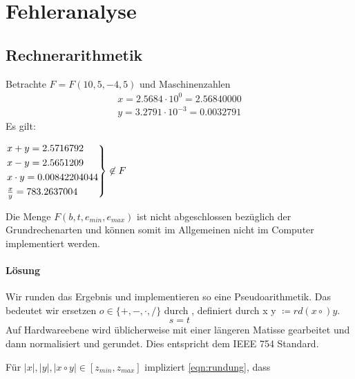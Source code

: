 \section{Fehleranalyse}
\subsection{Rechnerarithmetik}
\begin{example}
Betrachte $F=F(10,5,-4,5)$ und Maschinenzahlen
\begin{align*}
x=2.5684 \cdot 10^{0}= 2.56840000 \\
y=3.2791 \cdot 10^{-3} = 0.0032791
\end{align*}
Es gilt:\\
\begin{center}
$\begin{rcases}
	x+y= 2.5716792 \\
	x-y= 2.5651209 \\
	x \cdot y= 0.00842204044 \\
	\frac{x}{y}= 783.2637004
\end{rcases} \not\in F$
\end{center}
\end{example}
\begin{remark}
Die Menge $F(b,t,e_{min},e_{max})$ ist nicht abgeschlossen bezüglich der Grundrechenarten und können somit im Allgemeinen nicht im Computer implementiert werden.
\end{remark}
\paragraph{Lösung}
Wir runden das Ergebnis und implementieren so eine Pseudoarithmetik.
Das bedeutet wir ersetzen $o \in \{+,-,\cdot,/\} $ durch , definiert durch x  y $\coloneqq rd(x \circ )y$. 
\begin{equation}\label{eqn:rundung}
s=t
\end{equation}
Auf Hardwareebene wird üblicherweise mit einer längeren Matisse gearbeitet und dann normalisiert und gerundet. Dies entspricht dem IEEE 754 Standard.
\begin{remark}
	Für $|x|,|y|, |x \circ y| \in [z_{min},z_{max}]$ impliziert \eqref{eqn:rundung}, dass
\end{remark}
